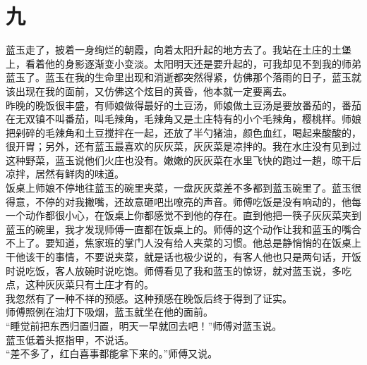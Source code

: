 \fancyhead[RO]{\thepage} %
\fancyhead[LE]{\thepage} %
\fancyfoot[LE,RO]{}
\fancyfoot[LO,CE]{}
\fancyfoot[CO,RE]{}
\chapter*{九}
蓝玉走了，披着一身绚烂的朝霞，向着太阳升起的地方去了。我站在土庄的土堡上，看着他的身影逐渐变小变淡。太阳明天还是要升起的，可我却见不到我的师弟蓝玉了。蓝玉在我的生命里出现和消逝都突然得紧，仿佛那个落雨的日子，蓝玉就该出现在我的面前，又仿佛这个炫目的黄昏，他本就一定要离去。\\

昨晚的晚饭很丰盛，有师娘做得最好的土豆汤，师娘做土豆汤是要放番茄的，番茄在无双镇不叫番茄，叫毛辣角，毛辣角又是土庄特有的小个毛辣角，樱桃样。师娘把剁碎的毛辣角和土豆搅拌在一起，还放了半勺猪油，颜色血红，喝起来酸酸的，很开胃；另外，还有蓝玉最喜欢的灰灰菜，灰灰菜是凉拌的。我在水庄没有见到过这种野菜，蓝玉说他们火庄也没有。嫩嫩的灰灰菜在水里飞快的跑过一趟，晾干后凉拌，居然有鲜肉的味道。\\

饭桌上师娘不停地往蓝玉的碗里夹菜，一盘灰灰菜差不多都到蓝玉碗里了。蓝玉很得意，不停的对我撇嘴，还故意砸吧出嘹亮的声音。师傅吃饭是没有响动的，他每一个动作都很小心，在饭桌上你都感觉不到他的存在。直到他把一筷子灰灰菜夹到蓝玉的碗里，我才发现师傅一直都在饭桌上的。师傅的这个动作让我和蓝玉的嘴合不上了。要知道，焦家班的掌门人没有给人夹菜的习惯。他总是静悄悄的在饭桌上干他该干的事情，不要说夹菜，就是话也极少说的，有客人他也只是两句话，开饭时说吃饭，客人放碗时说吃饱。师傅看见了我和蓝玉的惊讶，就对蓝玉说，多吃点，这种灰灰菜只有土庄才有的。\\

我忽然有了一种不祥的预感。这种预感在晚饭后终于得到了证实。\\

师傅照例在油灯下吸烟，蓝玉就坐在他的面前。\\

“睡觉前把东西归置归置，明天一早就回去吧！”师傅对蓝玉说。\\

蓝玉低着头抠指甲，不说话。\\

“差不多了，红白喜事都能拿下来的。”师傅又说。\\


